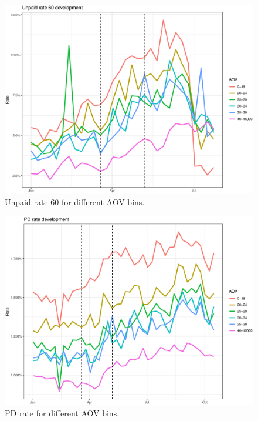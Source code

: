 
\begin{figure}[!ht]
  \centering
  \includegraphics[width=5in,trim={0 0 0 0},clip]{content/figures/rate60_dev_nl_aovbin.eps} 
  \caption{Unpaid rate 60 for different AOV bins.}
  \label{fig:rate60_dev_aov}
\end{figure}

\begin{figure}[!ht]
  \centering
  \includegraphics[width=5in,trim={0 0 0 0},clip]{content/figures/pd_dev_nl_aovbin.eps} 
  \caption{PD rate for different AOV bins.}
  \label{fig:pd_dev_aov}
\end{figure}



